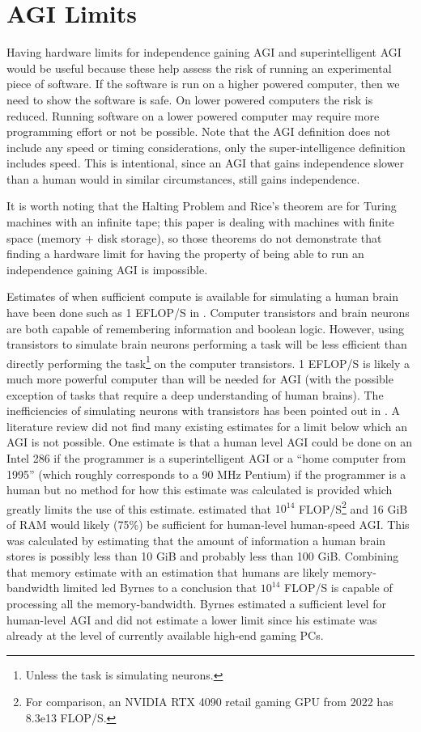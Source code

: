 \documentclass[letterpaper,twocolumn]{article}
\begin{document}
\section{AGI Limits}

Having hardware limits for independence gaining AGI and
superintelligent AGI would be useful because these help assess the
risk of running an experimental piece of software. If the software is
run on a higher powered computer, then we need to show the software is
safe. On lower powered computers the risk is reduced. Running software
on a lower powered computer may require more programming effort or not
be possible. Note that the AGI definition does not include any speed
or timing considerations, only the super-intelligence definition
includes speed. This is intentional, since an AGI that gains
independence slower than a human would in similar circumstances, still
gains independence.

It is worth noting that the Halting Problem and Rice's theorem are for
Turing machines with an infinite tape; this paper is dealing with
machines with finite space (memory + disk storage), so those theorems do not
demonstrate that finding a hardware limit for having the property of
being able to run an independence gaining AGI is impossible.

Estimates of when sufficient compute is available for simulating a
human brain have been done such as 1 EFLOP/S in
\cite{hpcbrainscience}. Computer transistors and brain neurons are
both capable of remembering information and boolean logic. However,
using transistors to simulate brain neurons performing a task will be
less efficient than directly performing the task\footnote{Unless the
task is simulating neurons.} on the computer transistors.  1 EFLOP/S
is likely a much more powerful computer than will be needed for AGI
(with the possible exception of tasks that require a deep
understanding of human brains).  The inefficiencies of simulating
neurons with transistors has been pointed out in
\cite{byrneshardwarerequirements}.  A literature review did not find
many existing estimates for a limit below which an AGI is not
possible. One estimate is that a human level AGI could be done on an
Intel 286 if the programmer is a superintelligent AGI or a ``home
computer from 1995'' (which roughly corresponds to a 90 MHz Pentium)
if the programmer is a human \citep{yudkowskyagilimit} but no method
for how this estimate was calculated is provided which greatly limits
the use of this estimate.  \cite{byrneshardwarerequirements} estimated
that $10^{14}$ FLOP/S\footnote{For comparison, an NVIDIA RTX 4090
retail gaming GPU from 2022 has 8.3e13 FLOP/S.} and 16 GiB of RAM
would likely (75\%) be sufficient for human-level human-speed
AGI. This was calculated by estimating that the amount of information
a human brain stores is possibly less than 10 GiB and probably less
than 100 GiB. Combining that memory estimate with an estimation that
humans are likely memory-bandwidth limited led Byrnes to a conclusion
that $10^{14}$ FLOP/S is capable of processing all the
memory-bandwidth. Byrnes estimated a sufficient level for human-level
AGI and did not estimate a lower limit since his estimate was already
at the level of currently available high-end gaming PCs.
\end{document}

